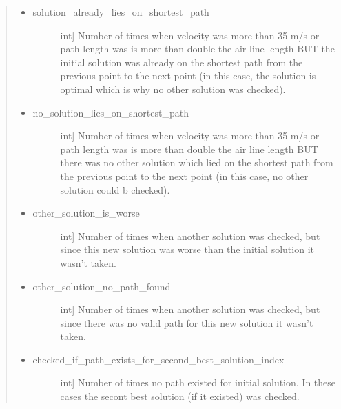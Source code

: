 \documentclass[letterpaper,10pt,english]{sphinxmanual}
\begin{document}
\begin{fulllineitems}
\begin{quote}
\begin{description}
\begin{description}
\begin{itemize}
\item {} \begin{description}
\item[{solution\_already\_lies\_on\_shortest\_path}] \leavevmode{[}int{]}
Number of times when velocity was more than 35 m/s or path length was is more than double the air line length BUT the initial solution was already on the shortest path from the previous point to the next point (in this case, the solution is optimal which is why no other solution was checked).

\end{description}

\item {} \begin{description}
\item[{no\_solution\_lies\_on\_shortest\_path}] \leavevmode{[}int{]}
Number of times when velocity was more than 35 m/s or path length was is more than double the air line length BUT there was no other solution which lied on the shortest path from the previous point to the next point (in this case, no other solution could b checked).

\end{description}

\item {} \begin{description}
\item[{other\_solution\_is\_worse}] \leavevmode{[}int{]}
Number of times when another solution was checked, but since this new solution was worse than the initial solution it wasn’t taken.

\end{description}

\item {} \begin{description}
\item[{other\_solution\_no\_path\_found}] \leavevmode{[}int{]}
Number of times when another solution was checked, but since there was no valid path for this new solution it wasn’t taken.

\end{description}

\item {} \begin{description}
\item[{checked\_if\_path\_exists\_for\_second\_best\_solution\_index}] \leavevmode{[}int{]}
Number of times no path existed for initial solution. In these cases the secont best solution (if it existed) was checked.


\end{description}
\end{itemize}
\end{description}
\end{description}
\end{quote}
\end{fulllineitems}
\end{document}

